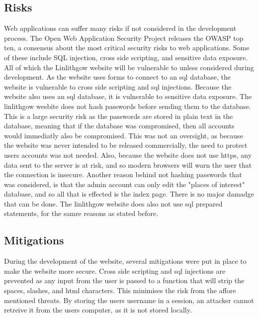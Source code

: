 \documentclass[12pt,a4paper]{article}
\begin{document}
		\subsection{Risks}
		Web applications can suffer many risks if not considered in the development process. The Open Web Application Security Project releases the OWASP top ten, a consensus about the most critical security risks to web applications. Some of these include SQL injection, cross side scripting, and sensitive data exposure. All of which the Linlithgow website will be vulnerable to unless considered during development. As the website uses forms to connect to an sql database, the website is vulnerable to cross side scripting and sql injections. Because the website also uses an sql database, it is vulnerable to sensitive data exposure. The linlithgow wesbite does not hash passwords before sending them to the database. This is a large security risk as the passwords are stored in plain text in the database, meaning that if the database was compromised, then all accounts would immediatly also be compromised. This was not an oversight, as because the website was never intended to be released commercially, the need to protect users accounts was not needed. Also, because the website does not use https, any data sent to the server is at risk, and so modern browsers will warn the user that the connection is insecure. Another reason behind not hashing passwords that was considered, is that the admin account can only edit the "places of interest" database, and so all that is effected is the index page. There is no major damadge that can be done. The linlithgow website does also not use sql prepared statements, for the samre reasons as stated before.

		\subsection{Mitigations}
		During the development of the website, several mitigations were put in place to make the website more secure. Cross side scripting and sql injections are prevented as any input from the user is passed to a function that will strip the spaces, slashes, and html characters. This minimises the risk from the affore mentioned threats. By storing the users username in a session, an attacker cannot retreive it from the users computer, as it is not stored locally.

	\clearpage
\end{document}
